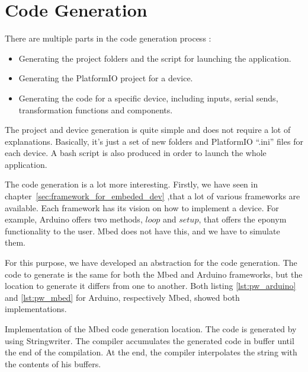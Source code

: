 \section{Code Generation}
\label{sec:code_generation}

There are multiple parts in the code generation process :
\begin{itemize}
\item Generating the project folders and the script for launching the application.
\item Generating the PlatformIO project for a device.
\item Generating the code for a specific device, including inputs, serial
  sends, transformation functions and components.
\end{itemize}

The project and device generation is quite simple and does not require a lot of
explanations. Basically, it's just a set of new folders and PlatformIO ``.ini''
files for each device. A bash script is also produced in order to launch the
whole application.

The code generation is a lot more interesting. Firstly, we have seen in
chapter~\ref{sec:framework_for_embeded_dev} ,that a lot of various
frameworks are available. Each framework has its vision on how to implement a device. For
example, Arduino offers two methods, $loop$ and $setup$, that offers the eponym
functionality to the user. Mbed does not have this, and we have to simulate them.

For this purpose, we have developed an abstraction for the code generation. The
code to generate is the same for both the Mbed and Arduino frameworks, but the
location to generate it differs from one to another. Both listing
\ref{lst:pw_arduino} and \ref{lst:pw_mbed} for Arduino, respectively Mbed,
showed both implementations.

\begin{listing}[!htbp]
  \centering
\begin{scalacode}
override def close(): Unit = {
    pw.append {
      s"""
         |#include <stdbool.h>
         |${if (generateTimer) s"""#include "Timer.h""""}
         |
         |${if (generateTimer) s"Timer t;"}
         |
         |// Global definition
         |${global.toString}
         |
         |// Function definition
         |${function.toString}
         |
         |void loop() {
         |  ${if (generateTimer) s"t.update();"}
         |  ${loop.toString}
         |}
         |
         |void setup() {
         |  ${if (generateSerial) s"Serial.begin(9600);"}
         |  ${setup.toString}
         |}
         |
       """.stripMargin
    }
    pw.flush()
    pw.close()
    formatSource()
  }
}
\end{scalacode}
  \caption[Implementation of the code generation location for
Arduino]{Implementation of the Mbed code generation location. The code is
generated by using Stringwriter. The compiler accumulates the generated code in
buffer until the end of the compilation. At the end, the compiler interpolates
the string with the contents of his buffers.}
\label{lst:pw_arduino}
\end{listing}

